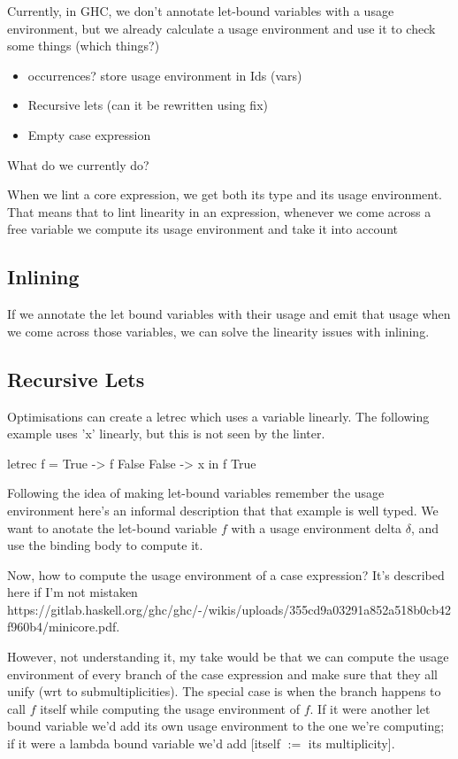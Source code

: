 \documentclass[a4paper, draft]{article}
\begin{document}
Currently, in GHC, we don't annotate let-bound variables with a usage
environment, but we already calculate a usage environment and use it to check
some things (which things?)

\begin{itemize}
    \item occurrences? store usage environment in Ids (vars)
    \item Recursive lets (can it be rewritten using fix)
    \item Empty case expression
\end{itemize}

What do we currently do?

When we lint a core expression, we get both its type and its usage environment.
That means that to lint linearity in an expression, whenever we come across a
free variable we compute its usage environment and take it into account

\subsection{Inlining}

If we annotate the let bound variables with their usage and emit that usage when
we come across those variables, we can solve the linearity issues with inlining.

\subsection{Recursive Lets}

Optimisations can create a letrec which uses a variable linearly. The following
example uses 'x' linearly, but this is not seen by the linter.
\begin{code}
letrec f = \case
        True -> f False
        False -> x
in f True
\end{code}

Following the idea of making let-bound variables remember the usage environment
here's an informal description that that example is well typed. We want to
anotate the let-bound variable $f$ with a usage environment delta $\delta$, and
use the binding body to compute it.

Now, how to compute the usage environment of a case expression? It's described
here if I'm not mistaken
https://gitlab.haskell.org/ghc/ghc/-/wikis/uploads/355cd9a03291a852a518b0cb42f960b4/minicore.pdf.

However, not understanding it, my take would be that we can compute the usage
environment of every branch of the case expression and make sure that they all
unify (wrt to submultiplicities). The special case is when the branch happens to
call $f$ itself while computing the usage environment of $f$. If it were another
let bound variable we'd add its own usage environment to the one we're
computing; if it were a lambda bound variable we'd add [itself $:=$ its
multiplicity].
\end{document}
